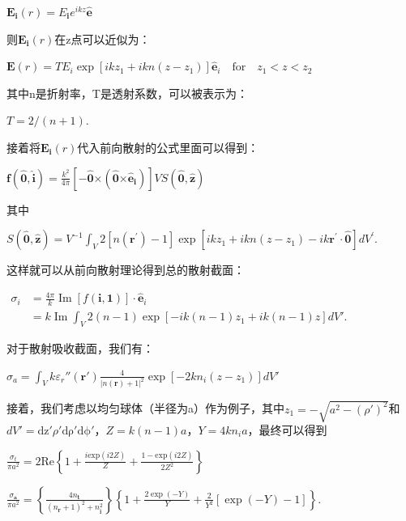 \documentclass[12pt, a4paper, oneside]{ctexart}
\begin{document}
\begin{spacing}{2.0}
\begin{center}
    $\mathbf{E}_\mathbf{i}(r)=E_\mathbf{i}e^{ikz}\mathbf{\hat{e}}$
\end{center}
则$\mathbf{E}_\mathbf{i}(r)$在z点可以近似为：
\begin{center}
    $\displaystyle \mathbf{E}(r)=TE_i\exp[ikz_1+ikn(z-z_1)]\mathbf{\hat{e}}_i\quad\text{for}\quad z_1<z<z_2$
\end{center}
其中n是折射率，T是透射系数，可以被表示为：
\begin{center}
    $\displaystyle T=2/(n+1).$
\end{center}
接着将$\mathbf{E}_\mathbf{i}(r)$代入前向散射的公式里面可以得到：
\begin{center}
    $\displaystyle \mathbf{f}(\mathbf{\hat{0}},\mathbf{\hat{i}})=\frac{k^2}{4\pi}[-\mathbf{\hat{0}}\mathbf{\times}(\mathbf{\hat{0}}\mathbf{\times}\mathbf{\hat{e}_i})]VS(\mathbf{\hat{0}},\mathbf{\hat{z}})$
\end{center}
其中
\begin{center}
    $\displaystyle S(\mathbf{\hat{0}},\mathbf{\hat{z}})=V^{-1}\int_{V}2[n(\mathbf{r}^{\prime})-1]\exp[i k z_{1}+i k n(z-z_{1})-i k\mathbf{r}^{\prime}\cdot\mathbf{\hat{0}}]d V^{\prime}.$
\end{center}

这样就可以从前向散射理论得到总的散射截面：
\begin{center}
    $\displaystyle \begin{aligned}\sigma_i&=\frac{4\pi}{k}\operatorname{Im}[f(\mathbf{i},\mathbf{1})]\cdot\hat{\mathbf{e}}_i\\ 
        &=k\operatorname{Im}\int_V2(n-1)\exp[-ik(n-1)z_1+ik(n-1)z]dV'.\end{aligned}$
\end{center}

对于散射吸收截面，我们有：
\begin{center}
    $\displaystyle \sigma_a=\int_V k\varepsilon_r''(\mathbf{r'})\frac{4}{|n(\mathbf{r})+1|^2}\exp[-2kn_i(z-z_1)]dV'$
\end{center}
接着，我们考虑以均匀球体（半径为a）作为例子，其中$z_1 = -\sqrt{a^2-(\rho')^2}$和$dV' = \mathrm{dz'}\rho'\mathrm{d\rho'}\mathrm{d\phi'}$，$Z = k(n-1)a$，$Y = 4kn_ia$，最终可以得到
\begin{center}
    $\displaystyle \frac{\sigma_t}{\pi a^2}=2\text{Re}\left\{1+\frac{i\text{exp}(i2Z)}{Z}+\frac{1-\text{exp}(i2Z)}{2Z^2}\right\}$
\end{center}

\begin{center}
    $\displaystyle\frac{\sigma_\mathbf a}{\pi a^2}=\left\{\frac{4n_\mathbf t}{(n_\mathbf r+1)^2+n_\mathbf i^2}\right\}\left\{1+\frac{2\exp(-Y)}{Y}+\frac{2}{Y^2}\left[\exp(-Y)-1\right]\right\}.$
\end{center}


\end{spacing}
\end{document}
